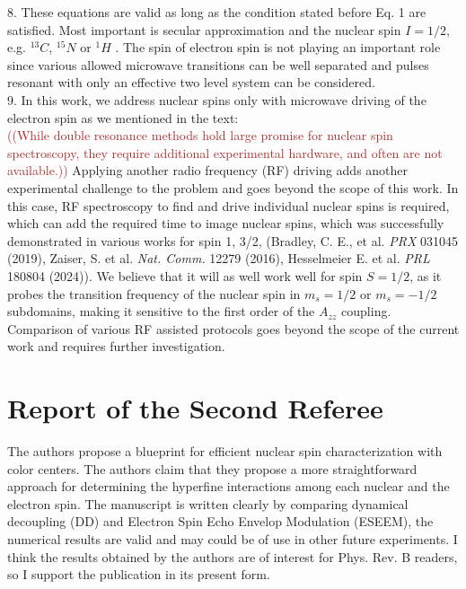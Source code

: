 \documentclass[12pt]{amsart}
\begin{document}
	8. These equations are valid as long as the condition stated before Eq. 1 are satisfied. Most important is secular approximation and the nuclear spin $I = 1/2$, e.g. $^{13}C$, $^{15}N$ or $^1 H$ . The spin of electron spin is not playing an important role since various allowed microwave transitions can be well separated and pulses resonant with only an effective two level system can be considered.\\
	
	9. In this work, we address nuclear spins only with microwave driving of the electron spin as we mentioned in the text:\\
	\textcolor{brown}{((While double resonance methods hold large promise for nuclear spin spectroscopy, they require additional experimental hardware, and often are not available.))}
	Applying another radio frequency (RF) driving adds another experimental challenge to the problem and goes beyond the scope of this work. In this case, RF spectroscopy to find and drive individual nuclear spins is required, which can add the required time to image nuclear spins, which was successfully demonstrated in various works for spin 1, 3/2,  
(Bradley, C. E., et al.  \textit{PRX}  031045 (2019), Zaiser, S. et al. \textit{Nat. Comm.} 12279 (2016), Hesselmeier E. et al. \textit{PRL} 180804 (2024)). We believe that it will as well work well for spin $S=1/2$, as it probes the transition frequency of the nuclear spin in $m_s=1/2$ or $m_s=-1/2$ subdomains, making it sensitive to the first order of the $A_{zz}$ coupling. Comparison of various RF assisted protocols goes beyond the scope of the current work and requires further investigation.\\

	\color{red} \section{Report of the Second Referee}
	The authors propose a blueprint for efficient nuclear spin
	characterization with color centers. The authors claim that they
	propose a more straightforward approach for determining the hyperfine
	interactions among each nuclear and the electron spin. The manuscript
	is written clearly by comparing dynamical decoupling (DD) and Electron
	Spin Echo Envelop Modulation (ESEEM), the numerical results are valid
	and may could be of use in other future experiments. I think the
	results obtained by the authors are of interest for Phys. Rev. B
	readers, so I support the publication in its present form.
	
\end{document}
